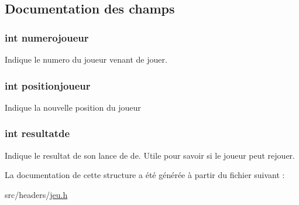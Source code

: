 \subsection{Documentation des champs}
\hypertarget{structstruct__retourjeu_a3e4028dc4a9077afc6e53e423343bd70}{
\subsubsection[{numerojoueur}]{\setlength{\rightskip}{0pt plus 5cm}int numerojoueur}}\label{structstruct__retourjeu_a3e4028dc4a9077afc6e53e423343bd70}
Indique le numero du joueur venant de jouer. \hypertarget{structstruct__retourjeu_a886601c5a72273d41b31c90740071a61}{
\subsubsection[{positionjoueur}]{\setlength{\rightskip}{0pt plus 5cm}int positionjoueur}}\label{structstruct__retourjeu_a886601c5a72273d41b31c90740071a61}
Indique la nouvelle position du joueur \hypertarget{structstruct__retourjeu_ac584e924232e3ffd27115c09c0fcc55d}{
\subsubsection[{resultatde}]{\setlength{\rightskip}{0pt plus 5cm}int resultatde}}\label{structstruct__retourjeu_ac584e924232e3ffd27115c09c0fcc55d}
Indique le resultat de son lance de de. Utile pour savoir si le joueur peut rejouer. 

La documentation de cette structure a été générée à partir du fichier suivant \-:\begin{DoxyCompactItemize}
\item 
src/headers/\hyperlink{jeu_8h}{jeu.\-h}\end{DoxyCompactItemize}

